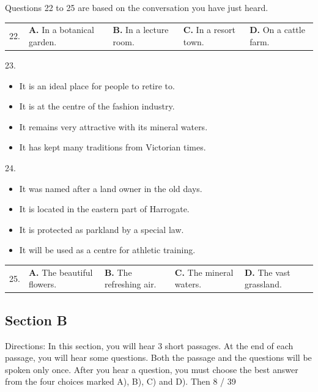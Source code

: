 \documentclass[UTF8,11pt]{ctexart}
\begin{document}
Questions 22 to 25 are based on the conversation you have just heard.


\noindent\begin{tabularx}{\linewidth}{@{}lXXXX@{}}22. & \textbf{A.} In a botanical garden. & \textbf{B.} In a lecture room. & \textbf{C.} In a resort town. & \textbf{D.} On a cattle farm.\\\end{tabularx}\par

23.


\begin{itemize}[leftmargin=2em,itemsep=.2em,topsep=.4em]\item[A.] It is an ideal place for people to retire to.
\item[B.] It is at the centre of the fashion industry.
\item[C.] It remains very attractive with its mineral waters.
\item[D.] It has kept many traditions from Victorian times.
\end{itemize}

24.


\begin{itemize}[leftmargin=2em,itemsep=.2em,topsep=.4em]\item[A.] It was named after a land owner in the old days.
\item[B.] It is located in the eastern part of Harrogate.
\item[C.] It is protected as parkland by a special law.
\item[D.] It will be used as a centre for athletic training.
\end{itemize}

\noindent\begin{tabularx}{\linewidth}{@{}lXXXX@{}}25. & \textbf{A.} The beautiful flowers. & \textbf{B.} The refreshing air. & \textbf{C.} The mineral waters. & \textbf{D.} The vast grassland.\\\end{tabularx}\par

\subsection*{\textbf{Section B}}


Directions: In this section, you will hear 3 short passages. At the end of each passage, you will hear some questions. Both the passage and the questions will be spoken only once. After you hear a question, you must choose the best answer from the four choices marked A), B), C) and D). Then 8 / 39
\end{document}
